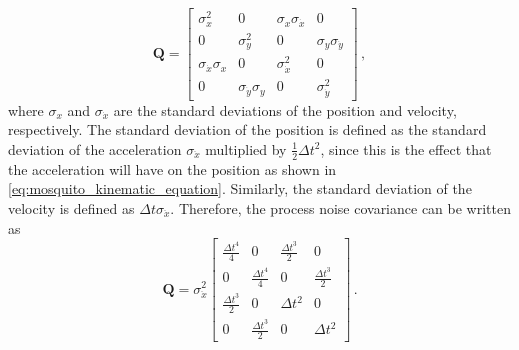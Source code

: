 \begin{equation}
  \label{eq:kalman_filter_process_noise_covariance_matrix}
  \mathbf{Q} = \begin{bmatrix}
    \sigma_{x}^2               & 0                          & \sigma_{x}\sigma_{\dot{x}} & 0                          \\
    0                          & \sigma_{y}^2               & 0                          & \sigma_{y}\sigma_{\dot{y}} \\
    \sigma_{\dot{x}}\sigma_{x} & 0                          & \sigma_{\dot{x}}^2         & 0                          \\
    0                          & \sigma_{\dot{y}}\sigma_{y} & 0                          & \sigma_{\dot{y}}^2
  \end{bmatrix}\,,
\end{equation}
where $\sigma_{x}$ and $\sigma_{\dot{x}}$ are the standard deviations of the position and velocity, respectively. The standard deviation of the position is defined as the standard deviation of the acceleration $\sigma_{\ddot{x}}$ multiplied by $\frac{1}{2}\Delta t^2$, since this is the effect that the acceleration will have on the position as shown in \autoref{eq:mosquito_kinematic_equation}. Similarly, the standard deviation of the velocity is defined as $\Delta t \sigma_{\ddot{x}}$. Therefore, the process noise covariance can be written as
\begin{equation}
  \mathbf{Q} =
  \sigma_{\ddot{x}}^{2}
  \begin{bmatrix}
    \frac{\Delta t^4}{4} & 0                    & \frac{\Delta t^3}{2} & 0                    \\
    0                    & \frac{\Delta t^4}{4} & 0                    & \frac{\Delta t^3}{2} \\
    \frac{\Delta t^3}{2} & 0                    & \Delta t^2           & 0                    \\
    0                    & \frac{\Delta t^3}{2} & 0                    & \Delta t^2
  \end{bmatrix}\,.
\end{equation}

